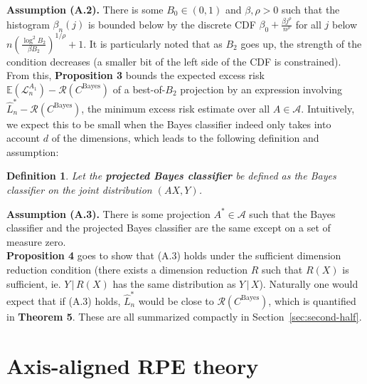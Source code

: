 \documentclass{amsart}
\newtheorem{definition}{Definition}
\newcommand\cbayes{C^{\mathrm{Bayes}}}
\newcommand\risk{\mathcal{L}}
\newcommand\rrisk{\mathcal{R}}
\begin{document}
\vspace{6pt}

\noindent \textbf{Assumption (A.2).} There is some $B_{0}\in(0,1)$
and $\beta,\rho>0$ such that the histogram $\beta_{n}(j)$ is bounded
below by the discrete CDF $\beta_{0}+\frac{\beta j^{\rho}}{n^{\rho}}$
for all $j$ below $n\left(\frac{\log^{2}B_{2}}{\beta B_{2}}\right)^{1/\rho}+1$.
It is particularly noted that as $B_{2}$ goes up, the strength of
the condition decreases (a smaller bit of the left side of the CDF
is constrained).\\


From this, \textbf{Proposition 3} bounds the expected excess risk
$\mathbb{E}(\risk_{n}^{A_{1}})-\rrisk(\cbayes)$ of a best-of-$B_{2}$
projection by an expression involving $\hat{L}_{n}^{*}-\rrisk(\cbayes)$,
the minimum excess risk estimate over all $A\in\mathcal A$. Intuitively,
we expect this to be small when the Bayes classifier indeed only takes
into account $d$ of the dimensions, which leads to the following
definition and assumption:

\begin{definition}
Let the \textbf{projected Bayes classifier} be defined
as the Bayes classifier on the joint distribution $(AX,Y)$.
\end{definition}


\noindent \textbf{Assumption (A.3).} There is some projection $A^{*}\in\mathcal{A}$
such that the Bayes classifier and the projected Bayes classifier
are the same except on a set of measure zero.\\


\textbf{Proposition 4} goes to show that (A.3) holds under the sufficient
dimension reduction condition (there exists a dimension reduction
$R$ such that $R(X)$ is sufficient, ie. $Y\,|\,R(X)$ has the same
distribution as $Y\,|\,X$). Naturally one would expect that if (A.3)
holds, $\hat{L}_{n}^{*}$ would be close to $\rrisk(\cbayes)$, which
is quantified in \textbf{Theorem 5}. These are all summarized compactly in
Section~\ref{sec:second-half}.




















\newpage
\section{Axis-aligned RPE theory}\label{sec:aa-rpe}
\end{document}
